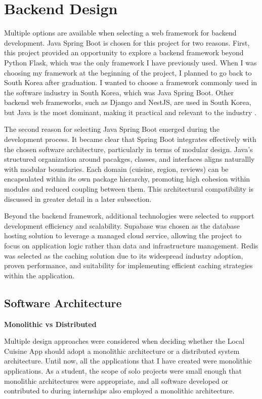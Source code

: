\section[Backend Design]{Backend Design}\label{sec:newsec}
Multiple options are available when selecting a web framework for backend development. Java Spring Boot is chosen for this project for two reasons.
First, this project provided an opportunity to explore a backend framework beyond Python Flask, which was the only framework I have previously used.
When I was choosing my framework at the beginning of the project, I planned to go back to South Korea after graduation.
I wanted to choose a framework commonly used in the software industry in South Korea, which was Java Spring Boot. Other backend 
web frameworks, such as Django and NestJS, are used in South Korea, but Java is the most dominant, making it practical and relevant to the industry \cite{Prime_Career}.

The second reason for selecting Java Spring Boot emerged during the development process. 
It became clear that Spring Boot integrates effectively with the chosen software architecture,
particularly in terms of modular design. Java's structured organization around pacakges, classes, and interfaces aligns naturallly with modular boundaries.
Each domain (cuisine, region, reviews) can be encapsulated within its own package hierarchy, promoting high cohesion within modules and reduced coupling between them.
This architectural compatibility is discussed in greater detail in a later subsection. 

Beyond the backend framework, additional technologies were selected to support development efficiency and scalability.
Supabase was chosen as the database hosting solution to leverage a managed cloud service, allowing the project to focus on application
logic rather than data and infrastructure management. Redis was selected as the caching solution due to its widespread industry adoption,
proven performance, and suitability for implementing efficient caching strategies within the application.

\subsection{Software Architecture}

\noindent \textbf{Monolithic vs Distributed}

Multiple design approaches were considered when deciding whether the Local Cuisine App should adopt a monolithic architecture or a distributed system architecture.
Until now, all the applications that I have created were monolithic applications. As a student, the scope of solo projects were small enough that 
monolithic architectures were appropriate, and all software developed or contributed to during internships also employed a monolithic architecture.

